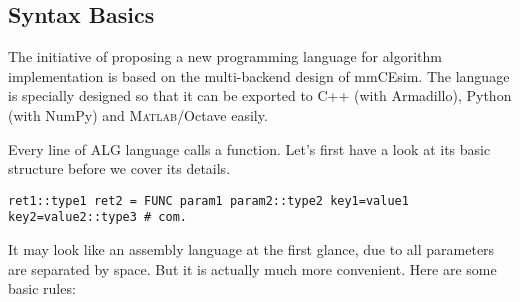 \subsection{Syntax Basics}
The initiative of proposing a new programming language for algorithm
implementation is based on the multi-backend design of mmCEsim.
The language is specially designed so that it can be exported to C++
(with Armadillo), Python (with NumPy) and \textsc{Matlab}/Octave easily.

Every line of ALG language calls a function.
Let's first have a look at its basic structure before we cover its details.
\begin{lstlisting}[language=mmcesim-sim, morekeywords={FUNC}]
ret1::type1 ret2 = FUNC param1 param2::type2 key1=value1 key2=value2::type3 # com.
\end{lstlisting}
It may look like an assembly language at the first glance,
due to all parameters are separated by space.
But it is actually much more convenient.
Here are some basic rules:
